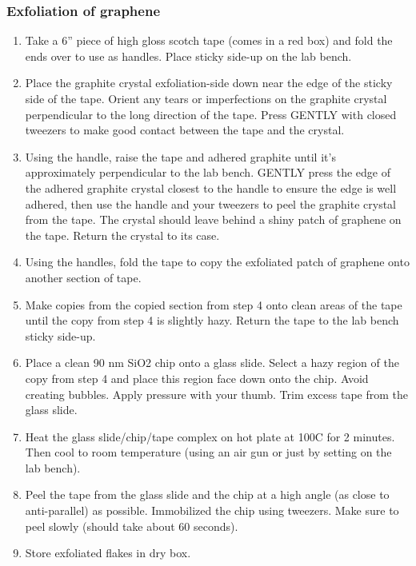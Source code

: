 \begin{appendices}
\subsubsection{Exfoliation of graphene}
\begin{enumerate}
	\item Take a 6” piece of high gloss scotch tape (comes in a red box) and fold the ends over to use as handles. Place sticky side-up on the lab bench.
	\item Place the graphite crystal exfoliation-side down near the edge of the sticky side of the tape. Orient any tears or imperfections on the graphite crystal perpendicular to the long direction of the tape. Press GENTLY with closed tweezers to make good contact between the tape and the crystal.
	\item Using the handle, raise the tape and adhered graphite until it’s approximately perpendicular to the lab bench. GENTLY press the edge of the adhered graphite crystal closest to the handle to ensure the edge is well adhered, then use the handle and your tweezers to peel the graphite crystal from the tape. The crystal should leave behind a shiny patch of graphene on the tape. Return the crystal to its case.
	\item Using the handles, fold the tape to copy the exfoliated patch of graphene onto another section of tape.
	\item Make copies from the copied section from step 4 onto clean areas of the tape until the copy from step 4 is slightly hazy. Return the tape to the lab bench sticky side-up.
	\item Place a clean 90 nm SiO2 chip onto a glass slide. Select a hazy region of the copy from step 4 and place this region face down onto the chip. Avoid creating bubbles. Apply pressure with your thumb. Trim excess tape from the glass slide.
	\item Heat the glass slide/chip/tape complex on hot plate at 100C for 2 minutes. Then cool to room temperature (using an air gun or just by setting on the lab bench).
	\item Peel the tape from the glass slide and the chip at a high angle (as close to anti-parallel) as possible. Immobilized the chip using tweezers. Make sure to peel slowly (should take about 60 seconds).
	\item Store exfoliated flakes in dry box.
\end{enumerate}


\end{appendices}
